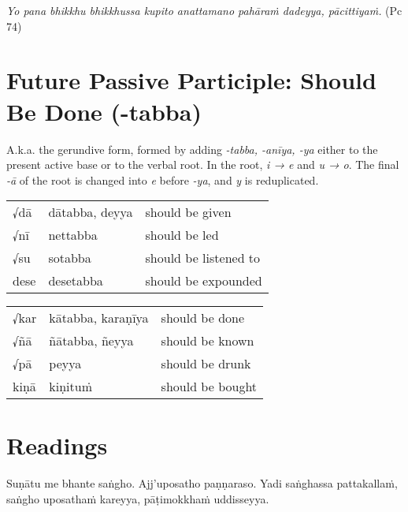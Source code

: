 \documentclass[11pt,oneside]{memoir}
\begin{document}
\emph{Yo pana bhikkhu bhikkhussa kupito anattamano pahāraṁ dadeyya, pācittiyaṁ.} (Pc 74)

\section{Future Passive Participle: Should Be Done (-tabba)}
\label{sec:orgeedc0e8}

A.k.a. the gerundive form, formed by adding \emph{-tabba, -anīya, -ya} either to the
present active base or to the verbal root. In the root, \emph{i → e} and \emph{u → o}.
The final \emph{-ā} of the root is changed into \emph{e} before \emph{-ya}, and \emph{y} is reduplicated.

\bigskip
{\centering\par
\begin{multicols}{2}

\begin{center}
\begin{tabular}{lll}
√dā & dātabba, deyya & should be given\\[0pt]
√nī & nettabba & should be led\\[0pt]
√su & sotabba & should be listened to\\[0pt]
dese & desetabba & should be expounded\\[0pt]
\end{tabular}
\end{center}

\columnbreak

\begin{center}
\begin{tabular}{lll}
√kar & kātabba, karaṇīya & should be done\\[0pt]
√ñā & ñātabba, ñeyya & should be known\\[0pt]
√pā & peyya & should be drunk\\[0pt]
kiṇā & kiṇituṁ & should be bought\\[0pt]
\end{tabular}
\end{center}

\end{multicols}
\par}

\section{Readings}
\label{sec:org2220f8c}

Suṇātu me bhante saṅgho.
Ajj'uposatho paṇṇaraso.
Yadi saṅghassa pattakallaṁ,
saṅgho uposathaṁ kareyya,
pāṭimokkhaṁ uddisseyya.
\end{document}
